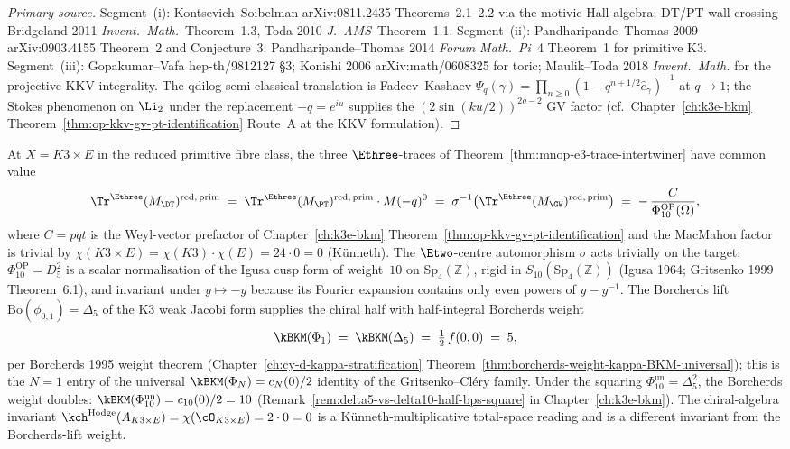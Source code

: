 \begin{proof}[Primary source]
Segment~(i): Kontsevich--Soibelman arXiv:0811.2435 Theorems~2.1--2.2
via the motivic Hall algebra; DT/PT wall-crossing Bridgeland 2011
\emph{Invent.~Math.}~Theorem~1.3, Toda 2010 \emph{J.~AMS}~Theorem~1.1.
Segment~(ii): Pandharipande--Thomas 2009 arXiv:0903.4155 Theorem~2 and
Conjecture~3; Pandharipande--Thomas 2014 \emph{Forum Math.~Pi}~4
Theorem~1 for primitive K3. Segment~(iii): Gopakumar--Vafa
hep-th/9812127 \S3; Konishi 2006 arXiv:math/0608325 for toric;
Maulik--Toda 2018 \emph{Invent.~Math.} for the projective KKV integrality.
The qdilog semi-classical translation is Fadeev--Kashaev
$\Psi_q(\gamma) = \prod_{n\geq 0}(1 - q^{n+1/2}\hat e_\gamma)^{-1}$ at
$q\to 1$; the Stokes phenomenon on $\Li_2$ under the replacement
$-q = e^{iu}$ supplies the $(2\sin(ku/2))^{2g-2}$ GV factor
(cf.\ Chapter~\ref{ch:k3e-bkm}
Theorem~\ref{thm:op-kkv-gv-pt-identification} Route~A at the KKV
formulation).
\end{proof}

\begin{corollary}[\texorpdfstring{$K3\times E$}{K3x E} reduced-primitive MNOP collapse and the \texorpdfstring{$\kBKM(\Phi_1) = 5$}{kBKM(Phi-1) = 5} chiral half]
\label{cor:mnop-k3e-reduced-primitive}
At $X = K3\times E$ in the reduced primitive fibre class, the three
$\Ethree$-traces of Theorem~\ref{thm:mnop-e3-trace-intertwiner} have
common value
\[
 \Tr^{\Ethree}(M_{\DT})^{\mathrm{red,\, prim}}
 \;=\; \Tr^{\Ethree}(M_{\PT})^{\mathrm{red,\, prim}}\cdot M(-q)^{0}
 \;=\; \sigma^{-1}\bigl(\Tr^{\Ethree}(M_{\GW})^{\mathrm{red,\, prim}}\bigr)
 \;=\; -\,\frac{C}{\Phi_{10}^{\mathrm{OP}}(\Omega)},
\]
where \(C = pqt\) is the Weyl-vector prefactor of
Chapter~\ref{ch:k3e-bkm} Theorem~\ref{thm:op-kkv-gv-pt-identification}
and the MacMahon factor is trivial by
$\chi(K3\times E) = \chi(K3)\cdot\chi(E) = 24\cdot 0 = 0$
(K\"unneth). The $\Etwo$-centre automorphism $\sigma$ acts trivially on
the target: \(\Phi_{10}^{\mathrm{OP}}=D_5^2\) is a scalar normalisation
of the Igusa cusp form of weight~\(10\) on
\(\mathrm{Sp}_4(\mathbb{Z})\), rigid in \(S_{10}(\mathrm{Sp}_4(\mathbb{Z}))\)
(Igusa 1964; Gritsenko 1999 Theorem~6.1), and invariant under
$y\mapsto -y$ because its Fourier expansion contains only even powers
of $y - y^{-1}$. The Borcherds lift
$\mathrm{Bo}(\phi_{0,1}) = \Delta_5$ of the K3 weak Jacobi form supplies
the chiral half with half-integral Borcherds weight
\[
 \kBKM(\Phi_1)
 \;=\; \kBKM(\Delta_5)
 \;=\; \tfrac{1}{2}\,f(0,0)
 \;=\; 5,
\]
per Borcherds 1995 weight theorem
(Chapter~\ref{ch:cy-d-kappa-stratification}
Theorem~\ref{thm:borcherds-weight-kappa-BKM-universal}); this is the
$N = 1$ entry of the universal $\kBKM(\Phi_N) = c_N(0)/2$ identity of
the Gritsenko--Cl\'ery family. Under the squaring
\(\Phi_{10}^{\mathrm{un}}=\Delta_5^2\), the Borcherds weight doubles:
\(\kBKM(\Phi_{10}^{\mathrm{un}}) = c_{10}(0)/2 = 10\)
(Remark~\ref{rem:delta5-vs-delta10-half-bps-square} in
Chapter~\ref{ch:k3e-bkm}). The chiral-algebra invariant
$\kch^{\mathrm{Hodge}}(A_{K3\times E}) = \chi(\cO_{K3\times E}) = 2\cdot 0 = 0$ is a
K\"unneth-multiplicative total-space reading and is a different
invariant from the Borcherds-lift weight.
\end{corollary}

